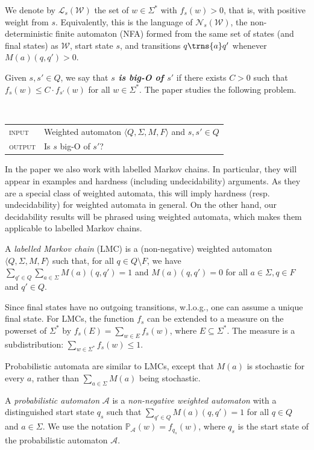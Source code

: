 \documentclass[10pt,a4paper]{amsart}
\numberwithin{equation}{section}
\theoremstyle{plain}
\theoremstyle{definition}
\theoremstyle{remark}
\newcommand\abra[1]{\langle #1 \rangle}
\newcommand\lng[2]{\mathcal{L}_{#1}(#2)}
\newcommand\pr{\mathbb{P}}
\newcommand\nfa{\mathcal{N}}
\newcommand\wa{\mathcal{W}}
\newcommand\nfaof[2]{\nfa_{#2}(#1)}
\renewcommand\nu{f}
\begin{document}
 \begin{defi}\label{def:nfaof} We denote by $\lng{s}{\wa}$  the set of $w\in \Sigma^\ast$
with $\nu_s(w) > 0 $, that is, with positive weight from $s$. Equivalently, this is the language of $\nfaof{\wa}{s}$, the non-deterministic finite automaton (NFA) formed from the same set of states (and final states) as $\wa$, start state $s$, and transitions $q\trns{a} q'$ whenever $M(a)(q,q') > 0$. \end{defi}

Given $s,s'\in Q$, we say that \textbf{\emph{$s$ is big-O of $s'$}} if there exists $C > 0 $ such that
$\nu_s(w) \le C \cdot \nu_{s'}(w)$  for all $w\in \Sigma^*$.
The paper studies  the following problem.


\begin{defi}\mbox{}\\
\begin{tabular}{ll}
\textsc{input} & Weighted automaton $\abra{Q, \Sigma{}, M, F}$ and $s,s'\in Q$\\
\textsc{output} & Is $s$ big-O of $s'$?
\end{tabular}
\end{defi}

\noindent In the paper we also work with labelled Markov chains. In particular, they will appear in examples and hardness (including undecidability) arguments.
As they are a special class of weighted automata, this will imply hardness (resp. undecidability) for weighted automata in general.
On the other hand, our decidability results will be phrased using weighted automata, which makes them applicable  to labelled Markov chains.
\begin{defi}
A \emph{labelled Markov chain} (LMC) is a (non-negative) weighted automaton  $\abra{Q, \Sigma{}, M, F}$ such that, for all $q\in Q\setminus F$,
we have $\sum_{q'\in Q}\sum_{a\in \Sigma{}} M(a)(q,q') = 1$  and   $M(a)(q,q') = 0$ for all  $a\in\Sigma{}, q\in F$ and $q' \in Q$.
\end{defi}
Since final states have no outgoing transitions, w.l.o.g., one can assume a unique final state.
For LMCs, the function $\nu_s$ can be extended to a measure on  the powerset of $\Sigma^\ast$ by
$\nu_s(E) = \sum_{ w\in E} \nu_s(w)$, where $E\subseteq \Sigma^*$. The measure is a subdistribution: $\sum_{w\in\Sigma^*} \nu_s(w) \le 1$.

Probabilistic automata are similar to LMCs, except that $M(a)$ is stochastic for every $a$, rather than
$\sum_{a\in \Sigma} M(a) $ being stochastic. \begin{defi}\label{defi:probautomata}
  A \textit{probabilistic automaton} $\mathcal{A}$ is a
\textit{non-negative weighted automaton} with a distinguished start state $q_s$ such that
$\sum_{q'\in Q} M(a)(q,q') = 1$ for all $q\in Q$ and $a \in \Sigma$. We use the notation $\pr_\mathcal{A}(w) = \nu_{q_s}(w)$, where $q_s$ is the start state of the probabilistic automaton $\mathcal{A}$.
\end{defi}
\end{document}
